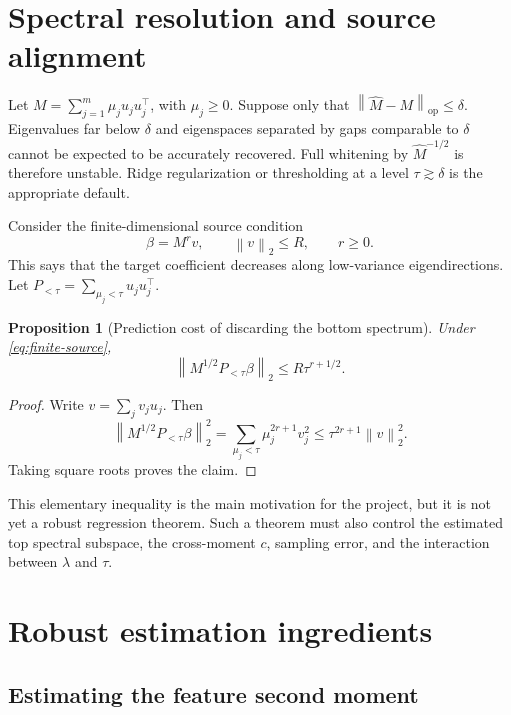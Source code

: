 \documentclass[11pt]{article}
\newtheorem{proposition}[definition]{Proposition}
\newcommand{\op}{\mathrm{op}}
\newcommand{\norm}[1]{\left\lVert #1\right\rVert}
\begin{document}
\section{Spectral resolution and source alignment}

Let $M=\sum_{j=1}^m\mu_j u_ju_j^\top$, with $\mu_j\geq0$.  Suppose only that
$\norm{\widehat M-M}_\op\leq\delta$.  Eigenvalues far below $\delta$ and
eigenspaces separated by gaps comparable to $\delta$ cannot be expected to be
accurately recovered.  Full whitening by $\widehat M^{-1/2}$ is therefore
unstable.  Ridge regularization or thresholding at a level
$\tau\gtrsim\delta$ is the appropriate default.

Consider the finite-dimensional source condition
\begin{equation}\label{eq:finite-source}
  \beta=M^r v,\qquad \norm v_2\leq R,\qquad r\geq0.
\end{equation}
This says that the target coefficient decreases along low-variance
eigendirections.  Let $P_{<\tau}=\sum_{\mu_j<\tau}u_ju_j^\top$.

\begin{proposition}[Prediction cost of discarding the bottom spectrum]
Under \eqref{eq:finite-source},
\begin{equation}\label{eq:trunc-bound}
 \norm{M^{1/2}P_{<\tau}\beta}_2
 \leq R\tau^{r+1/2}.
\end{equation}
\end{proposition}
\begin{proof}
Write $v=\sum_jv_ju_j$.  Then
\[
 \norm{M^{1/2}P_{<\tau}\beta}_2^2
 =\sum_{\mu_j<\tau}\mu_j^{2r+1}v_j^2
 \leq\tau^{2r+1}\norm v_2^2.
\]
Taking square roots proves the claim.
\end{proof}

This elementary inequality is the main motivation for the project, but it is
not yet a robust regression theorem.  Such a theorem must also control the
estimated top spectral subspace, the cross-moment $c$, sampling error, and the
interaction between $\lambda$ and $\tau$.

\section{Robust estimation ingredients}

\subsection{Estimating the feature second moment}
\end{document}
